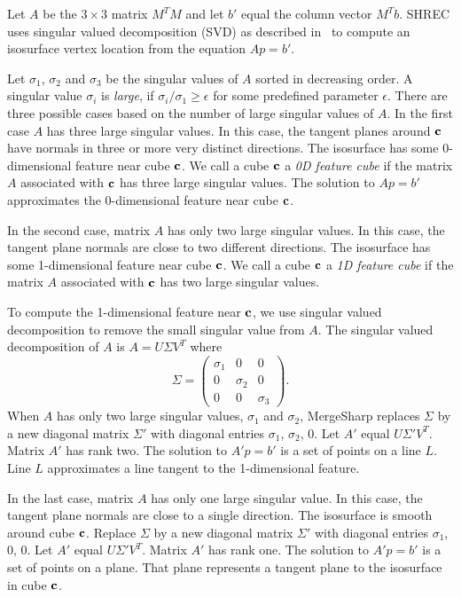 Let $A$ be the $3 \times 3$ matrix $M^T M$ and 
let $b'$ equal the column vector $M^T b$.
SHREC uses singular valued decomposition (SVD)
as described in~\cite{jlsw-dchd-02,kbsh-fssev-01,l-oslpm-00}
to compute an isosurface vertex location from the equation $A p = b'$.

Let $\sigma_1$, $\sigma_2$ and $\sigma_3$ be the singular values of $A$
sorted in decreasing order.
A singular value $\sigma_i$ is {\em large},
if $\sigma_i/\sigma_1 \ge \epsilon$ for some predefined parameter $\epsilon$.
There are three possible cases based on the number of large singular values
of $A$.
In the first case $A$ has three large singular values.
In this case, the tangent planes around $\mathbf{c}$ have normals in three or more
very distinct directions.
The isosurface has some 0-dimensional feature near cube $\mathbf{c}$.
We call a cube $\mathbf{c}$ a {\em 0D feature cube} if the matrix $A$ associated
with $\mathbf{c}$ has three large singular values.
The solution to $A p = b'$ approximates the 0-dimensional feature 
near cube $\mathbf{c}$.

In the second case, matrix $A$ has only two large singular values.
In this case, 
the tangent plane normals are close to two different directions.
The isosurface has some 1-dimensional feature near cube $\mathbf{c}$.
We call a cube $\mathbf{c}$ a {\em 1D feature cube} if the matrix $A$ associated
with $\mathbf{c}$ has two large singular values.

To compute the 1-dimensional feature near $\mathbf{c}$,
we use singular valued decomposition to remove the small singular value
from $A$.
The singular valued decomposition of $A$ is $A = U \Sigma V^T$
where
\begin{equation*}
\Sigma = \left (
\begin{array}{ccc}
\sigma_1 & 0 & 0 \\
0 & \sigma_2 & 0 \\
0 & 0 & \sigma_3
\end{array}
\right )
.
\end{equation*}
When $A$ has only two large singular values, $\sigma_1$ and $\sigma_2$,
MergeSharp replaces $\Sigma$ by a new diagonal matrix $\Sigma'$
with diagonal entries $\sigma_1$, $\sigma_2$, 0.
Let $A'$ equal $U \Sigma' V^T$.
Matrix $A'$ has rank two.
The solution to $A' p = b'$ is a set of points on a line $L$.
Line $L$ approximates a line tangent to the 1-dimensional feature.

In the last case,
matrix $A$ has only one large singular value.
In this case, the tangent plane normals are close to a single direction.
The isosurface is smooth around cube $\mathbf{c}$.
Replace $\Sigma$ by a new diagonal matrix $\Sigma'$
with diagonal entries $\sigma_1$, 0, 0.
Let $A'$ equal $U \Sigma' V^T$.
Matrix $A'$ has rank one.
The solution to $A' p = b'$ is a set of points on a plane.
That plane represents a tangent plane to the isosurface in cube $\mathbf{c}$.

